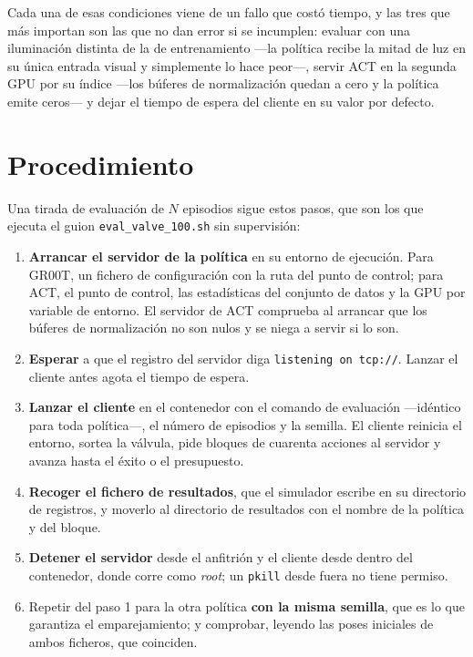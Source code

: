 Cada una de esas condiciones viene de un fallo que costó tiempo, y las tres que más importan son
las que no dan error si se incumplen: evaluar con una iluminación distinta de la de entrenamiento
—la política recibe la mitad de luz en su única entrada visual y simplemente lo hace peor—,
servir ACT en la segunda GPU por su índice —los búferes de normalización quedan a cero y la
política emite ceros— y dejar el tiempo de espera del cliente en su valor por defecto.

\section{Procedimiento}

Una tirada de evaluación de $N$ episodios sigue estos pasos, que son los que ejecuta el guion
\texttt{eval\_valve\_100.sh} sin supervisión:

\begin{enumerate}
	\item \textbf{Arrancar el servidor de la política} en su entorno de ejecución. Para GR00T, un
	fichero de configuración con la ruta del punto de control; para ACT, el punto de control, las
	estadísticas del conjunto de datos y la GPU por variable de entorno. El servidor de ACT
	comprueba al arrancar que los búferes de normalización no son nulos y se niega a servir si lo
	son.
	\item \textbf{Esperar} a que el registro del servidor diga \texttt{listening on tcp://}. Lanzar
	el cliente antes agota el tiempo de espera.
	\item \textbf{Lanzar el cliente} en el contenedor con el comando de evaluación —idéntico para
	toda política—, el número de episodios y la semilla. El cliente reinicia el entorno, sortea la
	válvula, pide bloques de cuarenta acciones al servidor y avanza hasta el éxito o el
	presupuesto.
	\item \textbf{Recoger el fichero de resultados}, que el simulador escribe en su directorio de
	registros, y moverlo al directorio de resultados con el nombre de la política y del bloque.
	\item \textbf{Detener el servidor} desde el anfitrión y el cliente desde dentro del contenedor,
	donde corre como \textit{root}; un \texttt{pkill} desde fuera no tiene permiso.
	\item Repetir del paso 1 para la otra política \textbf{con la misma semilla}, que es lo que
	garantiza el emparejamiento; y comprobar, leyendo las poses iniciales de ambos ficheros, que
	coinciden.
\end{enumerate}

